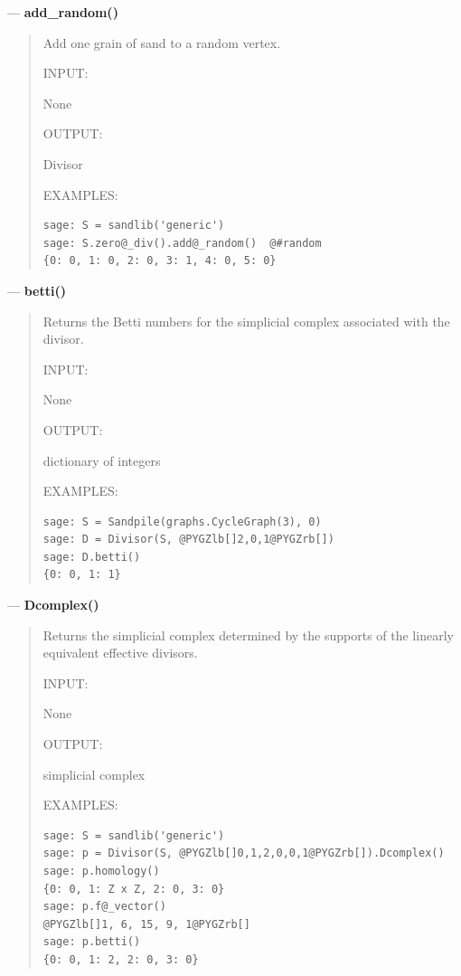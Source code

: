 \documentclass[letterpaper,10pt,english]{manual}
\begin{document}
---
\hypertarget{add-random-divisor}{}
\textbf{add\_random()}
\begin{quote}

Add one grain of sand to a random vertex.

INPUT:

None

OUTPUT:

Divisor

EXAMPLES:

\begin{Verbatim}[commandchars=@\[\]]
sage: S = sandlib('generic')
sage: S.zero@_div().add@_random()  @#random
{0: 0, 1: 0, 2: 0, 3: 1, 4: 0, 5: 0}
\end{Verbatim}
\end{quote}

---
\hypertarget{betti}{}
\textbf{betti()}
\begin{quote}

Returns the Betti numbers for the simplicial complex associated with
the divisor.

INPUT:

None

OUTPUT:

dictionary of integers

EXAMPLES:

\begin{Verbatim}[commandchars=@\[\]]
sage: S = Sandpile(graphs.CycleGraph(3), 0)
sage: D = Divisor(S, @PYGZlb[]2,0,1@PYGZrb[])
sage: D.betti()
{0: 0, 1: 1}
\end{Verbatim}
\end{quote}

---
\hypertarget{dcomplex}{}
\textbf{Dcomplex()}
\begin{quote}

Returns the simplicial complex determined by the supports of the
linearly equivalent effective divisors.

INPUT:

None

OUTPUT:

simplicial complex

EXAMPLES:

\begin{Verbatim}[commandchars=@\[\]]
sage: S = sandlib('generic')
sage: p = Divisor(S, @PYGZlb[]0,1,2,0,0,1@PYGZrb[]).Dcomplex()
sage: p.homology()
{0: 0, 1: Z x Z, 2: 0, 3: 0}
sage: p.f@_vector()
@PYGZlb[]1, 6, 15, 9, 1@PYGZrb[]
sage: p.betti()
{0: 0, 1: 2, 2: 0, 3: 0}
\end{Verbatim}
\end{quote}
\end{document}
